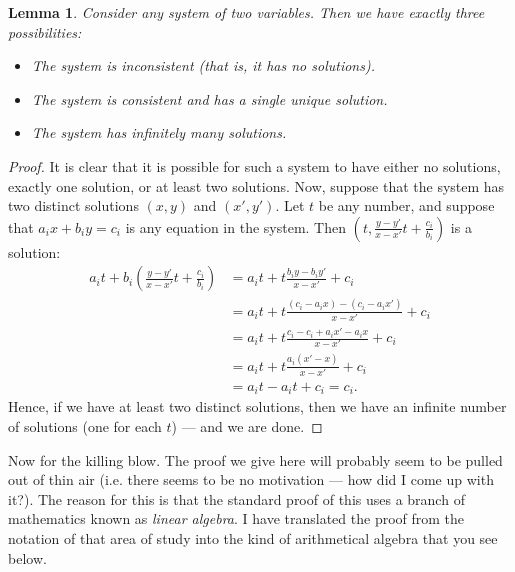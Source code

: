 \documentclass[a4paper,leqno]{article}
\numberwithin{equation}{section}
\newtheorem{lem}[equation]{Lemma}
\theoremstyle{definition}
\theoremstyle{remark}
\begin{document}
\begin{lem}
  Consider any system of two variables. Then we have exactly three possibilities:
  \begin{itemize}
    \item The system is inconsistent (that is, it has no solutions).
    \item The system is consistent and has a single unique solution.
    \item The system has infinitely many solutions.
  \end{itemize}
\end{lem}
\begin{proof}
  It is clear that it is possible for such a system to have either no solutions, exactly one solution, or at least two solutions. Now,
  suppose that the system has two distinct solutions $ (x,y) $ and $ (x',y') $. Let $ t $ be any number, and suppose that $ a_i x + b_i y = c_i $ is any equation
  in the system. Then $ \left(t, \frac{y - y'}{x - x'} t + \frac{c_i}{b_i}\right) $ is a solution:
  \begin{align*}
    a_i t + b_i \left(\frac{y - y'}{x - x'} t + \frac{c_i}{b_i}\right) &= a_i t + t\frac{b_i y - b_i y'}{x - x'} + c_i\\
                                                                       &= a_i t + t\frac{(c_i - a_i x) - (c_i - a_i x')}{x - x'} + c_i\\
                                                                       &= a_i t + t\frac{c_i - c_i + a_i x' - a_i x}{x - x'} + c_i\\
                                                                       &= a_i t + t\frac{a_i(x' - x)}{x - x'} + c_i\\
                                                                       &= a_i t - a_i t + c_i = c_i.
  \end{align*}
  Hence, if we have at least two distinct solutions, then we have an infinite number of solutions (one for each $ t $) --- and we are done.
\end{proof}

Now for the killing blow. The proof we give here will probably seem to be pulled out of thin air (i.e. there seems to be no motivation --- how
did I come up with it?). The reason for this is that the standard proof of this uses a branch of mathematics known as \emph{linear algebra}. I
have translated the proof from the notation of that area of study into the kind of arithmetical algebra that you see below.
\end{document}
